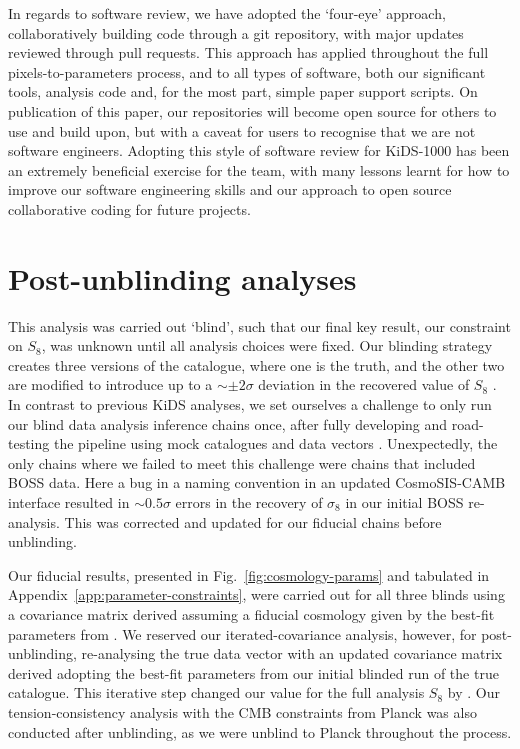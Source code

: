 \begin{appendix}
In regards to software review, we have adopted the `four-eye' approach, collaboratively building code through a git repository, with major updates reviewed through pull requests.   This approach has applied throughout the full pixels-to-parameters process, and to all types of software, both our significant tools, analysis code and, for the most part, simple paper support scripts.  On publication of this paper, our repositories will become open source for others to use and build upon, but with a caveat for users to recognise that we are not software engineers.   Adopting this style of software review for KiDS-1000 has been an extremely beneficial exercise for the team, with many lessons learnt for how to improve our software engineering skills and our approach to open source collaborative coding for future projects.     

\section{Post-unblinding analyses}
\label{app:unblinding}
This analysis was carried out `blind',  such that our final key result, our constraint on $S_8$, was unknown until all analysis choices were fixed.   Our blinding strategy creates three versions of the catalogue, where one is the truth, and the other two are modified to introduce up to a $\sim \pm 2\sigma$ deviation in the recovered value of $S_8$ \citep{kuijken/etal:2015, giblin/etal:inprep}.   In contrast to previous KiDS analyses, we set ourselves a challenge to only run our blind data analysis inference chains once, after fully developing and road-testing the pipeline using mock catalogues and data vectors \citep{joachimi/etal:inprep}.     Unexpectedly, the only chains where we failed to meet this challenge were chains that included BOSS data.   Here a bug in a naming convention in an updated {\sc CosmoSIS-CAMB} interface resulted in $\sim 0.5\sigma$ errors in the recovery of $\sigma_8$ in our initial BOSS re-analysis.  This was corrected and updated for our fiducial chains before unblinding.

Our fiducial results, presented in Fig.~\ref{fig:cosmology-params} and tabulated in Appendix~\ref{app:parameter-constraints}, were carried out for all three blinds using a covariance matrix derived assuming a fiducial cosmology given by the best-fit parameters from \citet{troester/etal:2020}.  We reserved our iterated-covariance analysis, however, for post-unblinding, re-analysing the true data vector with an updated covariance matrix derived adopting the best-fit parameters from our initial blinded run of the true catalogue.   This iterative step changed our value for the full \tttp analysis $S_8$ by .   Our tension-consistency analysis with the CMB constraints from Planck was also conducted after unblinding, as we were unblind to Planck throughout the process.


\end{appendix}
